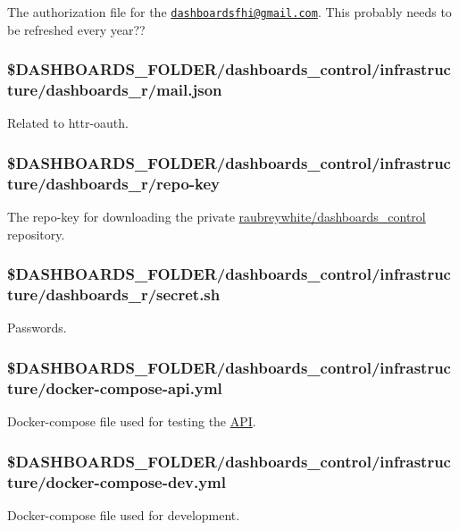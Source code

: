 \documentclass[12pt,]{article}
\begin{document}
The authorization file for the
\href{mailto:dashboardsfhi@gmail.com}{\nolinkurl{dashboardsfhi@gmail.com}}.
This probably needs to be refreshed every year??

\subsubsection{\$DASHBOARDS\_FOLDER/dashboards\_control/infrastructure/dashboards\_r/mail.json}\label{dashboards_folderdashboards_controlinfrastructuredashboards_rmail.json}

Related to \protect\hypertarget{httroauth}{}{httr-oauth}.

\subsubsection{\$DASHBOARDS\_FOLDER/dashboards\_control/infrastructure/dashboards\_r/repo-key}\label{dashboards_folderdashboards_controlinfrastructuredashboards_rrepo-key}

The repo-key for downloading the private
\href{https://github.com/raubreywhite/dashboards_control}{raubreywhite/dashboards\_control}
repository.

\subsubsection{\$DASHBOARDS\_FOLDER/dashboards\_control/infrastructure/dashboards\_r/secret.sh}\label{dashboards_folderdashboards_controlinfrastructuredashboards_rsecret.sh}

Passwords.

\subsubsection{\$DASHBOARDS\_FOLDER/dashboards\_control/infrastructure/docker-compose-api.yml}\label{dashboards_folderdashboards_controlinfrastructuredocker-compose-api.yml}

Docker-compose file used for testing the
\href{https://github.com/folkehelseinstituttet/dashboards_sykdomspuls/blob/master/inst/src/RunAPI.R}{API}.

\subsubsection{\$DASHBOARDS\_FOLDER/dashboards\_control/infrastructure/docker-compose-dev.yml}\label{dashboards_folderdashboards_controlinfrastructuredocker-compose-dev.yml}

Docker-compose file used for development.
\end{document}
